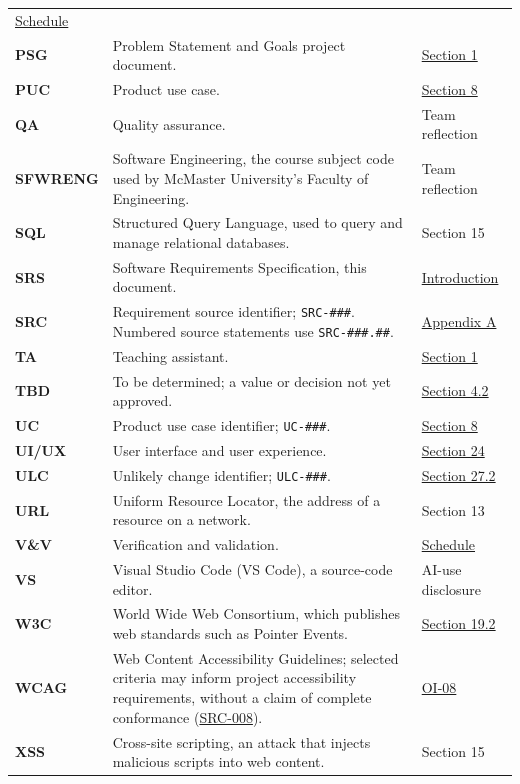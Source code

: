 \documentclass[12pt]{article}
\renewcommand{\_}{\textunderscore\allowbreak}%
\newcommand{\srcref}[1]{\hyperref[src:#1]{SRC-#1}}
\begin{document}
{\begin{longtable}{@{}>{\raggedright\arraybackslash}p{}>{\raggedright\arraybackslash}p{}>{\raggedright\arraybackslash}p{}@{}}
\hyperref[sec:constraints]{Schedule}\\
\textbf{PSG} & Problem Statement and Goals project document. &
\hyperref[sec:purpose]{Section 1}\\
\textbf{PUC} & Product use case. & \hyperref[sec:product-scope]{Section 8}\\
\textbf{QA} & Quality assurance. & Team reflection\\
\textbf{SFWRENG} & Software Engineering, the course subject code used by
McMaster University's Faculty of Engineering. & Team reflection\\
\textbf{SQL} & Structured Query Language, used to query and manage relational
databases. & Section 15\\
\textbf{SRS} & Software Requirements Specification, this document. &
\hyperref[sec:introduction]{Introduction}\\
\textbf{SRC} & Requirement source identifier; \texttt{SRC-\#\#\#}. Numbered
source statements use \texttt{SRC-\#\#\#.\#\#}. &
\hyperref[app:sources]{Appendix A}\\
\textbf{TA} & Teaching assistant. & \hyperref[sec:purpose]{Section 1}\\
\textbf{TBD} & To be determined; a value or decision not yet approved. &
\hyperref[sec:constants]{Section 4.2}\\
\textbf{UC} & Product use case identifier; \texttt{UC-\#\#\#}. &
\hyperref[sec:product-scope]{Section 8}\\
\textbf{UI/UX} & User interface and user experience. &
\hyperref[sec:user-docs]{Section 24}\\
\textbf{ULC} & Unlikely change identifier; \texttt{ULC-\#\#\#}. &
\hyperref[sec:changes]{Section 27.2}\\
\textbf{URL} & Uniform Resource Locator, the address of a resource on a network.
& Section 13\\
\textbf{V\&V} & Verification and validation. &
\hyperref[sec:constraints]{Schedule}\\
\textbf{VS} & Visual Studio Code (VS Code), a source-code editor. & AI-use
disclosure\\
\textbf{W3C} & World Wide Web Consortium, which publishes web standards such as
Pointer Events. & \hyperref[sec:ots-components]{Section 19.2}\\
\textbf{WCAG} & Web Content Accessibility Guidelines; selected criteria may
inform project accessibility requirements, without a claim of complete
conformance (\srcref{008}). & \hyperref[sec:open-issues]{OI-08}\\
\textbf{XSS} & Cross-site scripting, an attack that injects malicious scripts
into web content. & Section 15\\
\end{longtable}}
\end{document}
